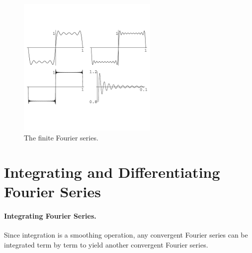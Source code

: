 \begin{figure}[h!]
  \begin{center}
    \includegraphics[width=0.6\textwidth]{ode/fourier_series/gibbs}
  \end{center}
  \caption{The finite Fourier series.}
  \label{gibbs}
\end{figure}






\section{Integrating and Differentiating Fourier Series}

\paragraph{Integrating Fourier Series.}
Since integration is a smoothing operation, any convergent Fourier 
series can be integrated term by term to yield another convergent
Fourier series.


